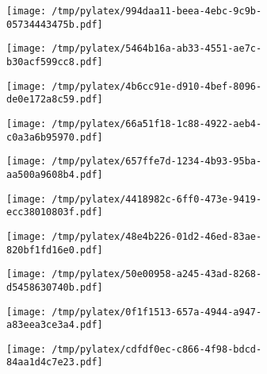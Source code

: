 \documentclass{article}
\begin{document}
\begin{figure}[htbp]
\begin{subfigure}[b]{.3\linewidth}
\texttt{[image: /tmp/pylatex/994daa11-beea-4ebc-9c9b-05734443475b.pdf]}
\end{subfigure}
\begin{subfigure}[b]{.3\linewidth}
\texttt{[image: /tmp/pylatex/5464b16a-ab33-4551-ae7c-b30acf599cc8.pdf]}
\end{subfigure}
\begin{subfigure}[b]{.3\linewidth}
\texttt{[image: /tmp/pylatex/4b6cc91e-d910-4bef-8096-de0e172a8c59.pdf]}
\end{subfigure}
\begin{subfigure}[b]{.3\linewidth}
\texttt{[image: /tmp/pylatex/66a51f18-1c88-4922-aeb4-c0a3a6b95970.pdf]}
\end{subfigure}
\begin{subfigure}[b]{.3\linewidth}
\texttt{[image: /tmp/pylatex/657ffe7d-1234-4b93-95ba-aa500a9608b4.pdf]}
\end{subfigure}
\begin{subfigure}[b]{.3\linewidth}
\texttt{[image: /tmp/pylatex/4418982c-6ff0-473e-9419-ecc38010803f.pdf]}
\end{subfigure}
\begin{subfigure}[b]{.3\linewidth}
\texttt{[image: /tmp/pylatex/48e4b226-01d2-46ed-83ae-820bf1fd16e0.pdf]}
\end{subfigure}
\begin{subfigure}[b]{.3\linewidth}
\texttt{[image: /tmp/pylatex/50e00958-a245-43ad-8268-d5458630740b.pdf]}
\end{subfigure}
\begin{subfigure}[b]{.3\linewidth}
\texttt{[image: /tmp/pylatex/0f1f1513-657a-4944-a947-a83eea3ce3a4.pdf]}
\end{subfigure}
\begin{subfigure}[b]{.3\linewidth}
\texttt{[image: /tmp/pylatex/cdfdf0ec-c866-4f98-bdcd-84aa1d4c7e23.pdf]}
\end{subfigure}
\end{figure}
\end{document}
